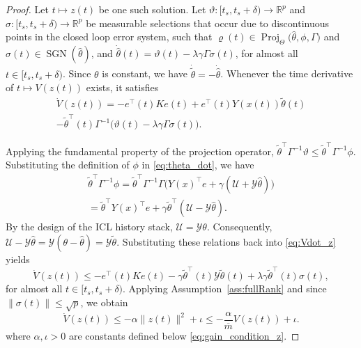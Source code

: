 \documentclass[conference]{ieeeconf}
\begin{document}
\begin{proof}
 Let $t \mapsto z(t)$ be one such solution. Let $\vartheta :[t_s,t_s+\delta)\to\mathbb{R}^p$ and $\sigma:[t_s,t_s+\delta)\to\mathbb{R}^p$ be measurable selections that occur due to discontinuous points in the closed loop error system, such that $\varrho(t)\in \operatorname{Proj}_\Theta\big(\hat{\theta}, \phi, \Gamma\big)$ and $ \sigma(t) \in \operatorname{SGN}(\hat{\theta})$, and  $\dot{\hat{\theta}}(t) = \vartheta(t) - \lambda \gamma \Gamma \sigma(t)$, for almost all $t\in[t_s,t_s+\delta)$. Since $\theta$ is constant, we have $\dot{\tilde{\theta}} = -\dot{\hat{\theta}}$. Whenever the time derivative of $t\mapsto V(z(t))$ exists, it satisfies
\begin{multline}
\dot{V}(z(t)) = -e^\top(t) K e(t) + e^\top(t) Y(x(t))\tilde{\theta}(t) \\- \tilde{\theta}^\top(t) \Gamma^{-1} \big( \vartheta(t) - \lambda \gamma \Gamma \sigma(t) \big). \label{eq:Vdot_z}
\end{multline}

Applying the fundamental property of the projection operator, $\tilde{\theta}^\top \Gamma^{-1} \vartheta \le \tilde{\theta}^\top \Gamma^{-1} \phi$. Substituting the definition of $\phi$ in \eqref{eq:theta_dot}, we have
\begin{multline}
\tilde{\theta}^\top \Gamma^{-1} \phi = \tilde{\theta}^\top \Gamma^{-1} \Gamma \Big(Y(x)^\top e + \gamma(\mathcal{U} + \mathcal{Y}\hat{\theta}) \Big) \\= \tilde{\theta}^\top Y(x)^\top e + \gamma \tilde{\theta}^\top (\mathcal{U} - \mathcal{Y}\hat{\theta}).
\end{multline}
By the design of the ICL history stack, $\mathcal{U} = \mathcal{Y}\theta$. Consequently, $\mathcal{U} - \mathcal{Y}\hat{\theta} = \mathcal{Y}(\theta - \hat{\theta}) = \mathcal{Y}\tilde{\theta}$. Substituting these relations back into \eqref{eq:Vdot_z} yields
\begin{equation}
\dot{V}(z(t)) \le -e^\top(t) K e(t) - \gamma \tilde{\theta}^\top(t) \mathcal{Y} \tilde{\theta}(t) + \lambda \gamma \tilde{\theta}^\top(t) \sigma(t), \label{eq:Vdot_z}
\end{equation}
for almost all $t\in [t_s,t_s + \delta)$. Applying Assumption~\ref{ass:fullRank} and since $\|\sigma(t)\| \leq \sqrt{p}$, we obtain
\begin{equation}\label{eq:Vdot_final}
\dot{V}(z(t)) \le -\alpha\|z(t)\|^2 + \iota \le -\frac{\alpha}{\overline{m}}V(z(t)) + \iota.
\end{equation}
where $\alpha, \iota  > 0$ are constants defined below \eqref{eq:gain_condition_z}.


\end{proof}
\end{document}
